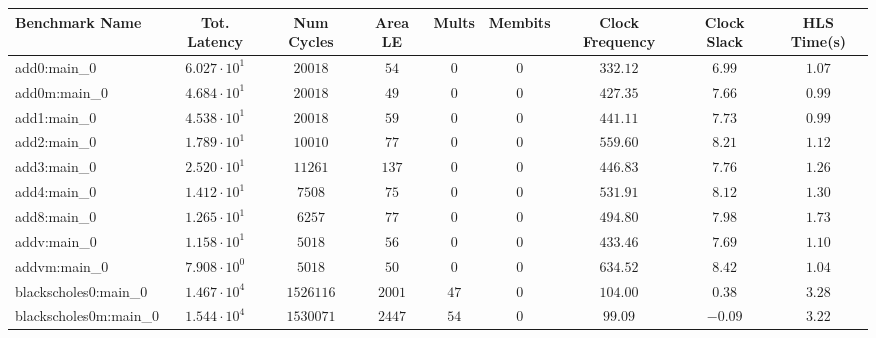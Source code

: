 \begin{tabular}{|l|c|c|c|c|c|c|c|c|}
\hline
Benchmark Name                 & Tot. Latency           & Num Cycles   & Area LE    & Mults    & Membits      & Clock Frequency & Clock Slack & HLS Time(s) \\
\hline
add0:main\_0                   & $ 6.027 \cdot 10^{1} $ & $ 20018    $ & $ 54     $ & $ 0    $ & $ 0        $ & $ 332.12      $ & $ 6.99    $ & $ 1.07    $ \\
add0m:main\_0                  & $ 4.684 \cdot 10^{1} $ & $ 20018    $ & $ 49     $ & $ 0    $ & $ 0        $ & $ 427.35      $ & $ 7.66    $ & $ 0.99    $ \\
add1:main\_0                   & $ 4.538 \cdot 10^{1} $ & $ 20018    $ & $ 59     $ & $ 0    $ & $ 0        $ & $ 441.11      $ & $ 7.73    $ & $ 0.99    $ \\
add2:main\_0                   & $ 1.789 \cdot 10^{1} $ & $ 10010    $ & $ 77     $ & $ 0    $ & $ 0        $ & $ 559.60      $ & $ 8.21    $ & $ 1.12    $ \\
add3:main\_0                   & $ 2.520 \cdot 10^{1} $ & $ 11261    $ & $ 137    $ & $ 0    $ & $ 0        $ & $ 446.83      $ & $ 7.76    $ & $ 1.26    $ \\
add4:main\_0                   & $ 1.412 \cdot 10^{1} $ & $ 7508     $ & $ 75     $ & $ 0    $ & $ 0        $ & $ 531.91      $ & $ 8.12    $ & $ 1.30    $ \\
add8:main\_0                   & $ 1.265 \cdot 10^{1} $ & $ 6257     $ & $ 77     $ & $ 0    $ & $ 0        $ & $ 494.80      $ & $ 7.98    $ & $ 1.73    $ \\
addv:main\_0                   & $ 1.158 \cdot 10^{1} $ & $ 5018     $ & $ 56     $ & $ 0    $ & $ 0        $ & $ 433.46      $ & $ 7.69    $ & $ 1.10    $ \\
addvm:main\_0                  & $ 7.908 \cdot 10^{0} $ & $ 5018     $ & $ 50     $ & $ 0    $ & $ 0        $ & $ 634.52      $ & $ 8.42    $ & $ 1.04    $ \\
blackscholes0:main\_0          & $ 1.467 \cdot 10^{4} $ & $ 1526116  $ & $ 2001   $ & $ 47   $ & $ 0        $ & $ 104.00      $ & $ 0.38    $ & $ 3.28    $ \\
blackscholes0m:main\_0         & $ 1.544 \cdot 10^{4} $ & $ 1530071  $ & $ 2447   $ & $ 54   $ & $ 0        $ & $ 99.09       $ & $ -0.09   $ & $ 3.22    $ \\

\end{tabular}
